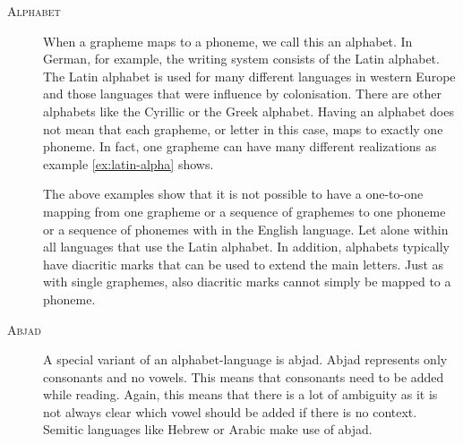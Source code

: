 \begin{description}
\item[\textsc{Alphabet}] When a grapheme maps to a phoneme, we call this an alphabet. In German, for example, the writing system consists of the Latin alphabet. The Latin alphabet is used for many different languages in western Europe and those languages that were influence by colonisation. There are other alphabets like the Cyrillic or the Greek alphabet. Having an alphabet does not mean that each grapheme, or letter in this case, maps to exactly one phoneme. In fact, one grapheme can have many different realizations as example \ref{ex:latin-alpha} shows.

The above examples show that it is not possible to have a one-to-one mapping from one grapheme or a sequence of graphemes to one phoneme or a sequence of phonemes with in the English language. Let alone within all languages that use the Latin alphabet. In addition, alphabets typically have diacritic marks that can be used to extend the main letters. Just as with single graphemes, also diacritic marks cannot simply be mapped to a phoneme.

\item[\textsc{Abjad}] A special variant of an alphabet-language is abjad. Abjad represents only consonants and no vowels. This means that consonants need to be added while reading. Again, this means that there is a lot of ambiguity as it is not always clear which vowel should be added if there is no context. Semitic languages like Hebrew or Arabic make use of abjad.



\end{description}
